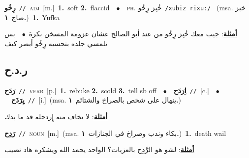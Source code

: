 \documentclass[10pt,a4paper,twoside]{article} %
\begin{document}
\begin{multicols}{2}
{\setlength\topsep{0pt}\textbf{\foreignlanguage{arabic}{رِخُو}}\ {\color{gray}\texttt{//}\color{black}}\ \textsc{adj}\ [m.]\ \textbf{1.}~soft  \textbf{2.}~flaccid\ \ $\bullet$\ \ \textsc{ph.} \color{gray} \foreignlanguage{arabic}{خُبِز رِخُو}\color{black}\ {\color{gray}\texttt{/{\sffamily xubiz rixuː}/}\color{black}}\ \color{gray} (msa. \foreignlanguage{arabic}{خبز صاج}~\foreignlanguage{arabic}{\textbf{١.}})\color{black}\ \textbf{1.}~Yufka\  \begin{flushright}\color{gray}\foreignlanguage{arabic}{\textbf{\underline{\foreignlanguage{arabic}{أمثلة}}}: جيب معك خُبِز رِخُو من عند أبو الصالح عشان عزومة المسخن بكرة\ $\bullet$\ \  بس تلمسي جلده بتحسيه رِخُو أبصر كيف}\end{flushright}\color{black}} \vspace{2mm}

\vspace{-3mm}
\subsection*{\color{blue}\foreignlanguage{arabic}{ر.د.ح}\color{blue}{}} 

{\setlength\topsep{0pt}\textbf{\foreignlanguage{arabic}{رَدَح}}\ {\color{gray}\texttt{//}\color{black}}\ \textsc{verb}\ [p.]\ \textbf{1.}~rebuke  \textbf{2.}~scold  \textbf{3.}~tell sb off\ \ $\bullet$\ \ \setlength\topsep{0pt}\textbf{\foreignlanguage{arabic}{اِرَدَح}}\ {\color{gray}\texttt{//}\color{black}}\ [c.]\ \ $\bullet$\ \ \setlength\topsep{0pt}\textbf{\foreignlanguage{arabic}{يِرَدَح}}\ {\color{gray}\texttt{//}\color{black}}\ [i.]\ \color{gray}(msa. \foreignlanguage{arabic}{ينهال على شخص بالصراخ والشتائم}~\foreignlanguage{arabic}{\textbf{١.}})\color{black}\  \begin{flushright}\color{gray}\foreignlanguage{arabic}{\textbf{\underline{\foreignlanguage{arabic}{أمثلة}}}: لا تخاف منه إِردحله قد ما بدك}\end{flushright}\color{black}} \vspace{2mm}

{\setlength\topsep{0pt}\textbf{\foreignlanguage{arabic}{رَدِح}}\ {\color{gray}\texttt{//}\color{black}}\ \textsc{noun}\ [m.]\ \color{gray}(msa. \foreignlanguage{arabic}{بكاء وندب وصراخ في الجنازات}~\foreignlanguage{arabic}{\textbf{١.}})\color{black}\ \textbf{1.}~death wail\  \begin{flushright}\color{gray}\foreignlanguage{arabic}{\textbf{\underline{\foreignlanguage{arabic}{أمثلة}}}: لشو هو الرَّدِح بالعزيات؟ الواحد يحمد الله ويشكره هاد نصيب}\end{flushright}\color{black}} \vspace{2mm}


\end{multicols}
\end{document}
